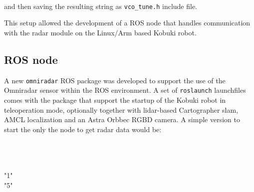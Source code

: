 \begin{Shaded}
\begin{Highlighting}[]
\NormalTok{[ }    \\
\NormalTok{    }\NormalTok{ ]}
\end{Highlighting}
\end{Shaded}

and then saving the resulting string as \texttt{vco\_tune.h} include
file.

This setup allowed the development of a ROS node that handles
communication with the radar module on the Linux/Arm based Kobuki robot.

\subsection{ROS node}\label{ros-node}

A new \texttt{omniradar} ROS package was developed to support the use of
the Omniradar sensor within the ROS environment. A set of
\texttt{roslaunch} launchfiles comes with the package that support the
startup of the Kobuki robot in teleoperation mode, optionally together
with lidar-based Cartographer slam, AMCL localization and an Astra
Orbbec RGBD camera. A simple version to start the only the node to get
radar data would be:

\begin{Shaded}
\begin{Highlighting}[]
\\
    \\
\NormalTok{    }\NormalTok{>}\\
 "1"\NormalTok{ />}\\
  "5"\NormalTok{ />}\\
\\
\end{Highlighting}
\end{Shaded}

